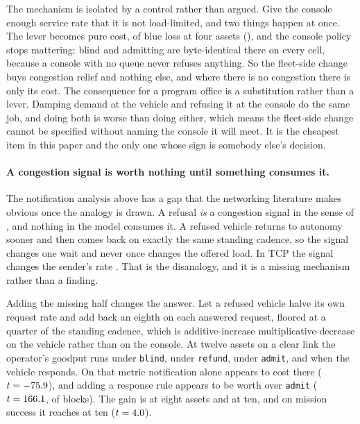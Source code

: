\documentclass[11pt]{article}
\begin{document}
The mechanism is isolated by a control rather than argued. Give the console enough service rate that it is not load-limited, and two things happen at once. The lever becomes pure cost, \FlFastCost{} of blue loss at four assets (\FlFastCostV{}), and the console policy stops mattering: blind and admitting are byte-identical there on every cell, because a console with no queue never refuses anything. So the fleet-side change buys congestion relief and nothing else, and where there is no congestion there is only its cost. The consequence for a program office is a substitution rather than a lever. Damping demand at the vehicle and refusing it at the console do the same job, and doing both is worse than doing either, which means the fleet-side change cannot be specified without naming the console it will meet. It is the cheapest item in this paper and the only one whose sign is somebody else's decision.

\paragraph{A congestion signal is worth nothing until something consumes it.} The notification analysis above has a gap that the networking literature makes obvious once the analogy is drawn. A refusal \emph{is} a congestion signal in the sense of \citet{floyd1999congestion}, and nothing in the model consumes it. A refused vehicle returns to autonomy sooner and then comes back on exactly the same standing cadence, so the signal changes one wait and never once changes the offered load. In TCP the signal changes the sender's rate \citep{jacobson1988congestion}. That is the disanalogy, and it is a missing mechanism rather than a finding.

Adding the missing half changes the answer. Let a refused vehicle halve its own request rate and add back an eighth on each answered request, floored at a quarter of the standing cadence, which is additive-increase multiplicative-decrease on the vehicle rather than on the console. At twelve assets on a clear link the operator's goodput runs \aiGoodClearBlindTwelve{} under \texttt{blind}, \aiGoodClearRefundTwelve{} under \texttt{refund}, \aiGoodClearAdmitTwelve{} under \texttt{admit}, and \aiGoodClearAimdTwelve{} when the vehicle responds. On that metric notification alone appears to cost \aiGoodClearTellTwelve{} there ($t = -75.9{}$), and adding a response rule appears to be worth \aiGoodClearGainTwelve{} over \texttt{admit} ($t = 166.1{}$, \aiGoodClearGainTwelveBlocks{} of \aiBlocks{} blocks). The gain is \aiGoodClearGainEight{} at eight assets and \aiGoodClearGainTen{} at ten, and on mission success it reaches \aiSuccClearGainTen{} at ten ($t = 4.0{}$).
\end{document}
